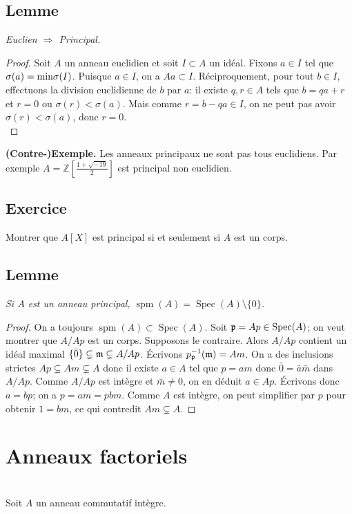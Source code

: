 \documentclass[a4paper, oneside, 12pt]{book}
\theoremstyle{theoremeStyle} %
\theoremstyle{definition} %
\DeclareMathOperator{\Spec}{Spec}
\DeclareMathOperator{\spm}{spm}
\newcommand{\Z}{\mathbb{Z}}
\begin{document}
\section{Lemme}\label{EuclIsPrinc} \textit{Euclien $\Rightarrow$ Principal.}

 \begin{proof} Soit $A$ un anneau euclidien et soit $I\subset A$ un idéal. Fixons $a\in I$ tel que $\sigma(a)=\hbox{\rm min}\sigma(I)$. Puisque $a\in I$, on a $Aa\subset I$. Réciproquement, pour tout $b\in I$, effectuons la division euclidienne de $b$ par $a$: il existe $q,r\in A$ tels que $b=qa+r$ et $r=0$ ou $\sigma(r)<\sigma(a)$. Mais comme $r=b-qa\in I$, on ne peut pas avoir $\sigma(r)<\sigma(a)$, donc $r=0$.\\
 \end{proof}

 \textbf{(Contre-)Exemple.} Les anneaux principaux ne sont pas tous euclidiens. Par exemple  $A=\Z[\frac{1+\sqrt{-19}}{2}]$ est principal non euclidien.\\

 \section{Exercice} Montrer que $A[X]$ est principal si et seulement si $A$ est un corps.
  \section{Lemme}\textit{Si $A$ est un anneau principal, $\spm(A)=\Spec(A)\setminus \lbrace 0\rbrace$.}

  \begin{proof} On a toujours $\spm(A)\subset \Spec(A)$. Soit $\frak{p}=Ap\in \Spec(A)$; on veut montrer que $A/Ap$ est un corps. Supposons le contraire. Alors $A/Ap$ contient un idéal maximal $\lbrace \bar{0}\rbrace\subsetneq\frak{m}\subsetneq A/Ap$. Écrivons $p_{\frak{p}}^{-1}(\frak{m})=Am$. On a des inclusions strictes  $Ap\subsetneq Am\subsetneq A$ donc il existe $a\in A$ tel que $p=am$ donc $\bar{0}=\bar{a}\bar{m}$ dans $A/Ap$. Comme $A/Ap$ est intègre et $\bar{m}\not= 0$, on en déduit $a\in Ap$. Écrivons donc $a=bp$; on a $p=am=pbm$. Comme $A$ est intègre, on peut simplifier par $p$ pour obtenir $1=bm$, ce qui contredit $ Am\subsetneq A$.   \end{proof}
 \chapter{Anneaux factoriels}\label{Factoriel} \textit{}\\
  Soit $A$ un anneau commutatif intègre. \\
\end{document}

